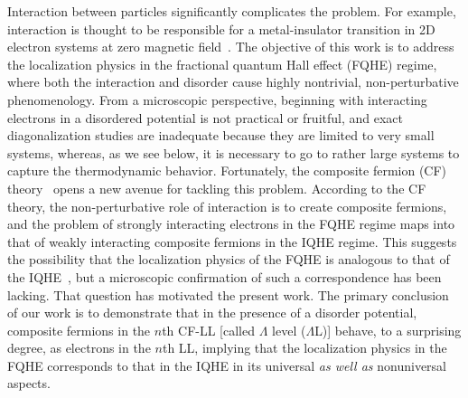 \documentclass[twocolumn,floatfix,prb,aps,showpacs]{revtex4-2}
\begin{document}
Interaction between particles significantly complicates the problem. For example, interaction is thought to be responsible for a metal-insulator transition in 2D electron systems at zero magnetic field~\cite{Kravchenko03}. 
The objective of this work is to address the localization physics in the fractional quantum Hall effect (FQHE) regime, where both the interaction and disorder cause highly nontrivial, non-perturbative phenomenology. 
From a microscopic perspective, beginning with interacting electrons in a disordered potential is not practical or fruitful, and exact diagonalization studies are inadequate because they are limited to very small systems, whereas, as we see below, it is necessary to go to rather large systems to capture the thermodynamic behavior. Fortunately, the composite fermion (CF) theory~\cite{Jain89,Jain90,Jain07} opens a new avenue for tackling this problem. According to the CF theory, the non-perturbative role of interaction is to create composite fermions, and the problem of strongly interacting electrons in the FQHE regime maps into that of weakly interacting composite fermions in the IQHE regime. This suggests the possibility that the localization physics of the FQHE is analogous to that of the IQHE~\cite{Jain90b,Kivelson92}, but a microscopic confirmation of such a correspondence has been lacking.  That question has motivated the present work. The primary conclusion of our work is to demonstrate that in the presence of a disorder potential, composite fermions in the $n$th CF-LL [called $\Lambda$ level ($\Lambda$L)] behave, to a surprising degree, as electrons in the $n$th LL, implying that the localization physics in the FQHE corresponds to that in the IQHE in its universal {\it as well as} nonuniversal aspects.
\end{document}
